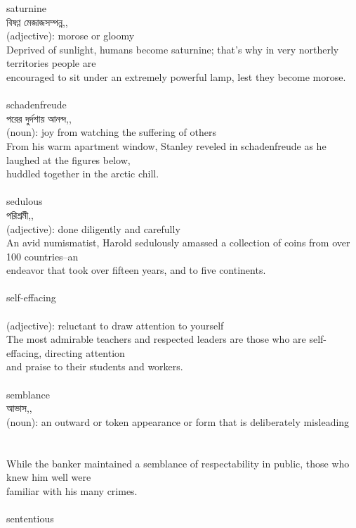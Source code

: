 \documentclass{article}
\begin{document}
{{saturnine}\\
{বিষণ্ণ মেজাজসম্পন্ন,,}\\
{(adjective): morose or gloomy\\Deprived of sunlight, humans become saturnine; that's why in very northerly territories people are\\encouraged to sit under an extremely powerful lamp, lest they become morose.\\}\\
{schadenfreude}\\
{পরের দুর্দশায় আনন্দ,,}\\
{(noun): joy from watching the suffering of others\\From his warm apartment window, Stanley reveled in schadenfreude as he laughed at the figures below,\\huddled together in the arctic chill.\\}\\
{sedulous}\\
{পরিশ্রমী,,}\\
{(adjective): done diligently and carefully\\An avid numismatist, Harold sedulously amassed a collection of coins from over 100 countries--an\\endeavor that took over fifteen years, and to five continents.\\}\\
{self-effacing}\\
{}\\
{(adjective): reluctant to draw attention to yourself\\The most admirable teachers and respected leaders are those who are self-effacing, directing attention\\and praise to their students and workers.\\}\\
{semblance}\\
{আভাস,,}\\
{(noun): an outward or token appearance or form that is deliberately misleading\\\\                                                                                 \\While the banker maintained a semblance of respectability in public, those who knew him well were\\familiar with his many crimes.\\}\\
{sententious}\\
}
\end{document}
